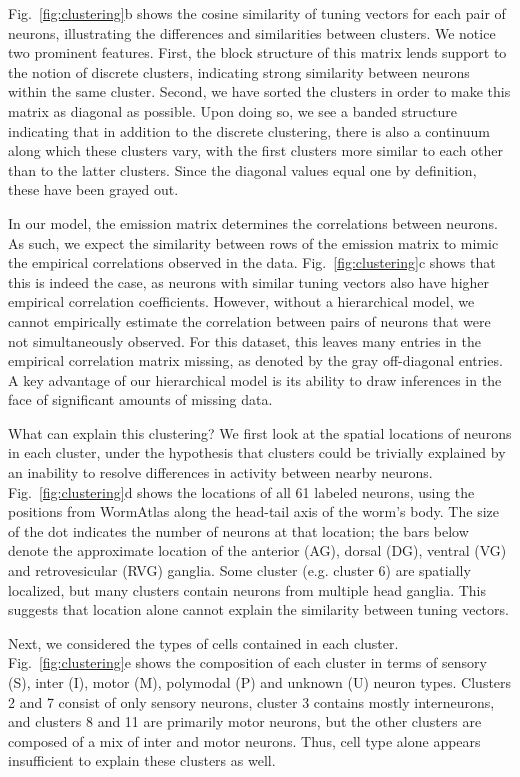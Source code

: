 \documentclass[11pt]{article}
\begin{document}
Fig.~\ref{fig:clustering}b shows the cosine similarity of tuning
vectors for each pair of neurons, illustrating the differences
and similarities between clusters.  We notice two prominent
features.  First, the block structure of this
matrix lends support to the notion of discrete clusters, indicating
strong similarity between neurons within the same cluster. Second,
we have sorted the clusters in order to make this matrix as
diagonal as possible.  Upon doing so, we see a banded structure
indicating that in addition to the discrete clustering, there is
also a continuum along which these clusters vary, with the first
clusters more similar to each other than to the latter clusters.
Since the diagonal values equal one by definition, these
have been grayed out. 

In our model, the emission matrix determines the correlations between
neurons.  As such, we expect the similarity between rows of the
emission matrix to mimic the empirical correlations observed in the
data.  Fig.~\ref{fig:clustering}c shows that this is indeed the case,
as neurons with similar tuning vectors also have higher empirical
correlation coefficients.  However, without a hierarchical model, we
cannot empirically estimate the correlation between pairs of neurons
that were not simultaneously observed.  For this dataset, this leaves
many entries in the empirical correlation matrix missing, as denoted
by the gray off-diagonal entries. A key advantage of our hierarchical
model is its ability to draw inferences in the face of significant
amounts of missing data.

What can explain this clustering?  We first look at the spatial
locations of neurons in each cluster, under the hypothesis that
clusters could be trivially explained by an inability to resolve
differences in activity between nearby neurons.
Fig.~\ref{fig:clustering}d shows the locations of all 61 labeled
neurons, using the positions from WormAtlas \citep{wormatlas} along the
head-tail axis of the worm's body.  The size of the dot indicates the
number of neurons at that location; the bars below denote the
approximate location of the anterior (AG), dorsal (DG), ventral (VG)
and retrovesicular (RVG) ganglia.  Some cluster (e.g. cluster 6) are
spatially localized, but many clusters contain neurons from multiple
head ganglia.  This suggests that location alone cannot explain the
similarity between tuning vectors.

Next, we considered the types of cells contained in each cluster.
Fig.~\ref{fig:clustering}e shows the composition of each cluster in
terms of sensory (S), inter (I), motor (M), polymodal (P) and unknown
(U) neuron types.  Clusters 2 and 7 consist of only sensory neurons,
cluster 3 contains mostly interneurons, and clusters 8 and 11 are
primarily motor neurons, but the other clusters are composed of a mix
of inter and motor neurons. Thus, cell type alone appears insufficient to
explain these clusters as well. 
\end{document}
